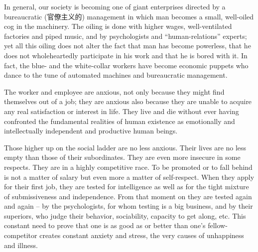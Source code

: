 \documentclass[a4paper]{article}
\begin{document}
\par
In general, our society is becoming one of giant enterprises directed by a bureaucratic (官僚主义的) management in which man becomes a small, well-oiled cog in the machinery. The oiling is done with higher wages, well-ventilated factories and piped music, and by psychologists and “human-relations” experts; yet all this oiling does not alter the fact that man has become powerless, that he does not wholeheartedly participate in his work and that he is bored with it. In fact, the blue- and the white-collar workers have become economic puppets who dance to the tune of automated machines and bureaucratic management.

\par
The worker and employee are anxious, not only because they might find themselves out of a job; they are anxious also because they are unable to acquire any real satisfaction or interest in life. They live and die without ever having confronted the fundamental realities of human existence as emotionally and intellectually independent and productive human beings.

\par
Those higher up on the social ladder are no less anxious. Their lives are no less empty than those of their subordinates. They are even more insecure in some respects. They are in a highly competitive race. To be promoted or to fall behind is not a matter of salary but even more a matter of self-respect. When they apply for their first job, they are tested for intelligence as well as for the tight mixture of submissiveness and independence. From that moment on they are tested again and again -- by the psychologists, for whom testing is a big business, and by their superiors, who judge their behavior, sociability, capacity to get along, etc. This constant need to prove that one is as good as or better than one’s fellow-competitor creates constant anxiety and stress, the very causes of unhappiness and illness.
\end{document}
